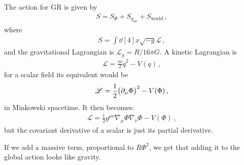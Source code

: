 \documentclass[main.tex]{subfiles}
\begin{document}
The action for GR is given by 
%
\begin{align}
  S = S_{\Phi } + S_{g_{\mu \nu }} + S_{\text{world}}
\,,
\end{align}
%
where 
%
\begin{align}
  S = \int \dd[4]{x} \sqrt{-g} \mathscr{L}
\,,
\end{align}
%
and the gravitational Lagrangian is \(\mathscr{L}_g = R /16 \pi G\).
A kinetic Lagrangian is  
%
\begin{align}
  \mathscr{L}  = \frac{m}{2} \dot{q}^2 - V(q)
\,,
\end{align}
%
for a scalar field its equivalent would be 
%
\begin{align}
  \mathscr{L} = \frac{1}{2} \qty(\partial_{\mu } \Phi )^2-V(\Phi )
\,,
\end{align}
%
in Minkowski spacetime. It then becomes: 
%
\begin{align}
  \mathscr{L} = \frac{1}{2} g^{\mu \nu } \nabla_{\mu } \Phi \nabla_{\nu } \Phi - V(\Phi )
\,,
\end{align}
%
but the covariant derivative of a scalar is just its partial derivative.

If we add a massive term, proportional to \(R \Phi^2\), we get that adding it to the global action looks like gravity.
\end{document}
